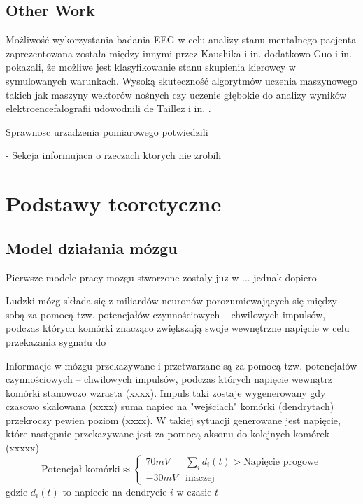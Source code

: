 \documentclass{./assets/wfis}
\begin{document}
\section{Other Work}

Możliwość wykorzystania badania EEG w celu analizy stanu mentalnego pacjenta zaprezentowana została między innymi przez Kaushika i in. \cite{kaushik_decoding_2022} dodatkowo Guo i in. \cite{guo_detection_2018} pokazali, że możliwe jest klasyfikowanie stanu skupienia kierowcy w symulowanych warunkach. Wysoką skuteczność algorytmów uczenia maszynowego takich jak maszyny wektorów nośnych czy uczenie głębokie do analizy wyników elektroencefalografii udowodnili de Taillez i in. \cite{de_taillez_machine_2020}. 

Sprawnosc urzadzenia pomiarowego potwiedzili 

- Sekcja informujaca o rzeczach ktorych nie zrobili

\chapter{Podstawy teoretyczne}
\section{Model działania mózgu}
Pierwsze modele pracy mozgu stworzone zostaly juz w ... jednak dopiero

Ludzki mózg składa się z miliardów neuronów porozumiewających się między sobą za pomocą tzw. potencjałów czynnościowych – chwilowych impulsów, podczas których komórki znacząco zwiększają swoje wewnętrzne napięcie w celu przekazania sygnału do

Informacje w mózgu przekazywane i przetwarzane są za pomocą tzw. potencjałów czynnościowych – chwilowych impulsów, podczas których napięcie wewnątrz komórki stanowczo wzrasta (xxxx). Impuls taki zostaje wygenerowany gdy czasowo skalowana (xxxx) suma napiec na "wejściach" komórki (dendrytach) przekroczy pewien poziom (xxxx). W takiej sytuacji generowane jest napięcie, które następnie przekazywane jest za pomocą aksonu do kolejnych komórek (xxxxx)
\begin{equation}
    \text{Potencjał komórki} \approx 
    \begin{cases} 
      70mV & \sum_i d_i(t) > \text{Napięcie progowe}  \\
      -30mV &  \text{inaczej}
   \end{cases}
\end{equation}
gdzie $d_i(t)$ to napiecie na dendrycie $i$ w czasie $t$
\end{document}
